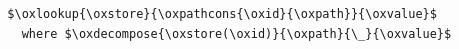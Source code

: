 \begin{lstlisting}
  $\oxlookup{\oxstore}{\oxpathcons{\oxid}{\oxpath}}{\oxvalue}$
    where $\oxdecompose{\oxstore(\oxid)}{\oxpath}{\_}{\oxvalue}$
\end{lstlisting}